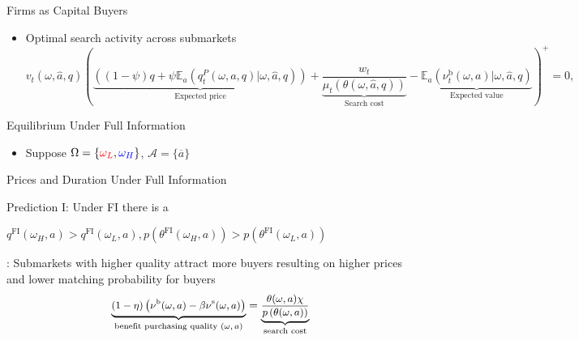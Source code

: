 \documentclass[english,xcolor=svgnames,aspectratio=169]{beamer}
\newcommand{\FullInfo}{^{\mathrm{FI}}}
\newcommand{\Seller}{^\mathrm{s}}
\newcommand{\Buyer}{^\mathrm{b}}
\begin{document}
\begin{frame}{Firms as Capital Buyers}

\begin{itemize}

\item {\color{dblue}Optimal search activity across submarkets}
{\scriptsize
\begin{equation*}
{v}_{t}(\omega,\hat a, q)\left( \underbrace{((1-\psi)q + \psi \mathbb E_a(q^{P}_{t}(\omega,a,q)|\omega,\hat a,q))}_\text{Expected price}+ \underbrace{\frac{w_{t}}{\mu_{t}(\theta(\omega,\hat a,q))}}_\text{Search cost}-\underbrace{\mathbb E_a \left( \nu^{\mathrm{b}}_{t}(\omega,a)| \omega,\hat a,q\right) }_{\text{Expected value}}\right)^{+}=0,
\label{buyer_indifference}
\end{equation*}}

\begin{figure}
\end{figure}


\end{itemize}


\end{frame}

\begin{frame}{Equilibrium Under Full Information}

\begin{itemize}

\item Suppose $\Omega=\{{\color{red}{\omega_L}},{\color{blue}{\omega_H}}\}$, $\mathcal{A}=\{\overline{a}\}$
\bigskip

\begin{figure}
\end{figure}


\end{itemize}

\end{frame}


\begin{frame}{Prices and Duration Under Full Information}\label{main:full_info}

Prediction I: Under FI there is a  {\color{dblue}{\bf negative relationship between prices and duration}} \medskip

$q\FullInfo(\omega_{H},a)>q\FullInfo(\omega_{L},a), p\left(\theta\FullInfo(\omega_{H},a)\right)>p\left(\theta\FullInfo(\omega_{L},a)\right)$ \medskip


\bigskip

{{\color{dblue}{Intuition}}: Submarkets with higher quality attract more buyers resulting on higher prices and lower matching probability for buyers
\begin{align*}\small
\underbrace{(1-\eta)\left(\nu\Buyer(\omega,a)-\beta \nu\Seller(\omega,a) \right)}_{\text{benefit purchasing quality $(\omega,a)$}}= \underbrace{\frac{\theta(\omega,a)\chi}{p\left(\theta(\omega,a)\right)}}_{\text{search cost}}
\end{align*}
}


\end{frame}
\end{document}
